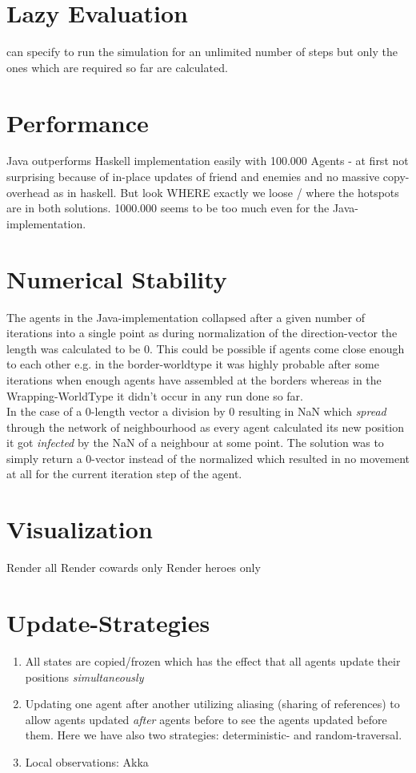 \section{Lazy Evaluation}
can specify to run the simulation for an unlimited number of steps but only the ones which are required so far are calculated.

\section{Performance}
Java outperforms Haskell implementation easily with 100.000 Agents - at first not surprising because of in-place updates of friend and enemies and no massive copy-overhead as in haskell. But look WHERE exactly we loose / where the hotspots are in both solutions. 1000.000 seems to be too much even for the Java-implementation.

\section{Numerical Stability}
The agents in the Java-implementation collapsed after a given number of iterations into a single point as during normalization of the direction-vector the length was calculated to be 0. This could be possible if agents come close enough to each other e.g. in the border-worldtype it was highly probable after some iterations when enough agents have assembled at the borders whereas in the Wrapping-WorldType it didn't occur in any run done so far. \\
In the case of a 0-length vector a division by 0  resulting in NaN which \textit{spread} through the network of neighbourhood as every agent calculated its new position it got \textit{infected} by the NaN of a neighbour at some point. The solution was to simply return a 0-vector instead of the normalized which resulted in no movement at all for the current iteration step of the agent. 

\section{Visualization}
Render all
Render cowards only
Render heroes only

\section{Update-Strategies}
\begin{enumerate}
\item All states are copied/frozen which has the effect that all agents update their positions \textit{simultaneously}
\item Updating one agent after another utilizing aliasing (sharing of references) to allow agents updated \textit{after} agents before to see the agents updated before them. Here we have also two strategies: deterministic- and random-traversal.
\item Local observations: Akka
\end{enumerate}


